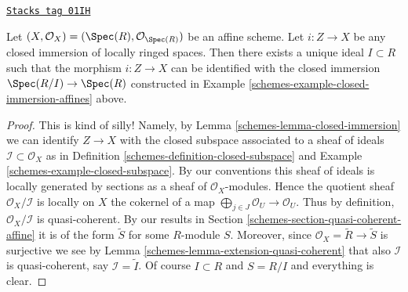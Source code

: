 \begin{lemma}
\label{schemes-lemma-closed-immersion-affine-case}
\href{https://stacks.math.columbia.edu/tag/01IH}{\texttt{Stacks tag 01IH}}


Let $(X, \mathcal{O}_X) = (\Spec(R), \mathcal{O}_{\Spec(R)})$
be an affine scheme. Let $i : Z \to X$ be any closed immersion
of locally ringed spaces. Then there exists a unique ideal
$I \subset R$ such that the morphism $i : Z \to X$ can be identified
with the closed immersion $\Spec(R/I) \to \Spec(R)$
constructed in Example \ref{schemes-example-closed-immersion-affines} above.
\end{lemma}

\begin{proof}

This is kind of silly! Namely, by Lemma \ref{schemes-lemma-closed-immersion}
we can identify $Z \to X$ with the closed subspace associated to
a sheaf of ideals $\mathcal{I} \subset \mathcal{O}_X$ as in
Definition \ref{schemes-definition-closed-subspace} and
Example \ref{schemes-example-closed-subspace}.
By our conventions this sheaf of ideals is locally generated
by sections as a sheaf of $\mathcal{O}_X$-modules.
Hence the quotient sheaf $\mathcal{O}_X / \mathcal{I}$
is locally on $X$ the cokernel
of a map $\bigoplus_{j \in J} \mathcal{O}_U \to \mathcal{O}_U$.
Thus by definition, $\mathcal{O}_X / \mathcal{I}$ is quasi-coherent.
By our results in Section \ref{schemes-section-quasi-coherent-affine}
it is of the form $\widetilde S$ for some $R$-module $S$.
Moreover, since $\mathcal{O}_X = \widetilde R \to \widetilde S$
is surjective we see by Lemma \ref{schemes-lemma-extension-quasi-coherent}
that also $\mathcal{I}$ is quasi-coherent, say $\mathcal{I} = \widetilde I$.
Of course $I \subset R$ and $S = R/I$ and everything is clear.
\end{proof}

